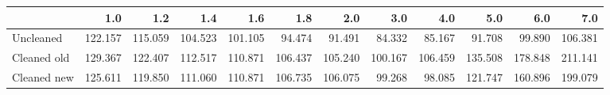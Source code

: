 \begin{tabular}{lrrrrrrrrrrr}
\toprule
{} &     1.0 &     1.2 &     1.4 &     1.6 &     1.8 &     2.0 &     3.0 &     4.0 &     5.0 &     6.0 &     7.0 \\
\midrule
Uncleaned   & 122.157 & 115.059 & 104.523 & 101.105 &  94.474 &  91.491 &  84.332 &  85.167 &  91.708 &  99.890 & 106.381 \\
Cleaned old & 129.367 & 122.407 & 112.517 & 110.871 & 106.437 & 105.240 & 100.167 & 106.459 & 135.508 & 178.848 & 211.141 \\
Cleaned new & 125.611 & 119.850 & 111.060 & 110.871 & 106.735 & 106.075 &  99.268 &  98.085 & 121.747 & 160.896 & 199.079 \\
\bottomrule
\end{tabular}
